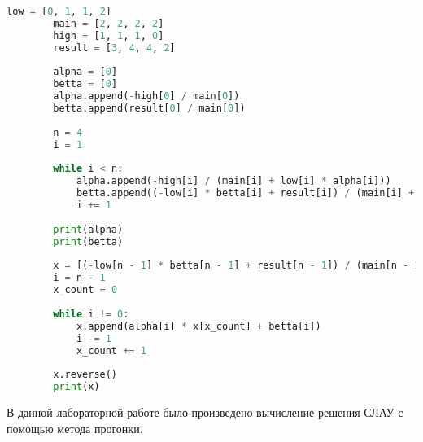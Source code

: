 \documentclass[14pt, a4paper, fleqn]{extarticle}
\begin{document}
	\begin{lstlisting}[language=Python, caption={Реализация метода прогонки}]
		low = [0, 1, 1, 2]
		main = [2, 2, 2, 2]
		high = [1, 1, 1, 0]
		result = [3, 4, 4, 2]
		
		alpha = [0]
		betta = [0]
		alpha.append(-high[0] / main[0])
		betta.append(result[0] / main[0])
		
		n = 4
		i = 1
		
		while i < n:
			alpha.append(-high[i] / (main[i] + low[i] * alpha[i]))
			betta.append((-low[i] * betta[i] + result[i]) / (main[i] + low[i] * alpha[i]))
			i += 1
		
		print(alpha)
		print(betta)
		
		x = [(-low[n - 1] * betta[n - 1] + result[n - 1]) / (main[n - 1] + low[n - 1] * alpha[n - 1])]
		i = n - 1
		x_count = 0
		
		while i != 0:
			x.append(alpha[i] * x[x_count] + betta[i])
			i -= 1
			x_count += 1
		
		x.reverse()
		print(x)
	\end{lstlisting}
	В данной лабораторной работе было произведено вычисление решения СЛАУ с помощью метода прогонки.
			
\end{document}
